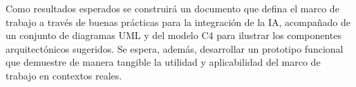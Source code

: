\begin{enumerate}

Como resultados esperados se construirá un documento que defina el marco de trabajo a través de buenas prácticas para la integración de la IA, acompañado de un conjunto de diagramas UML y del modelo C4 para ilustrar los componentes arquitectónicos sugeridos. Se espera, además, desarrollar un prototipo funcional que demuestre de manera tangible la utilidad y aplicabilidad del marco de trabajo en contextos reales.


\end{enumerate}
